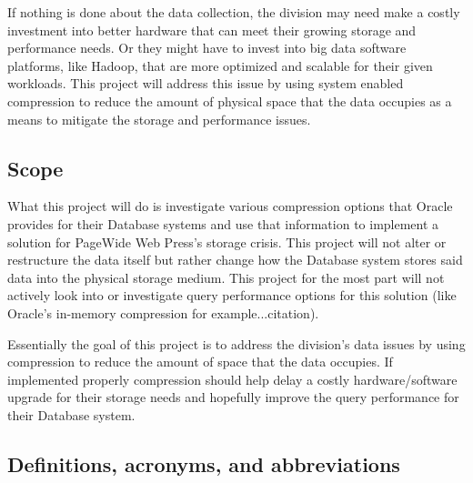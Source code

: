 \documentclass[10pt]{article}
\begin{document}
If nothing is done about the data collection, the division may need make a costly investment into better hardware that can meet their growing storage and performance needs. Or they might have to invest into big data software platforms, like Hadoop, that are more optimized and scalable for their given workloads. This project will address this issue by using system enabled compression to reduce the amount of physical space that the data occupies as a means to mitigate the storage and performance issues.


\subsection{Scope}

What this project will do is investigate various compression options that Oracle provides for their Database systems and use that information to implement a solution for PageWide Web Press's storage crisis. This project will not alter or restructure the data itself but rather change how the Database system stores said data into the physical storage medium. This project for the most part will not actively look into or investigate query performance options for this solution (like Oracle's in-memory compression for example...citation).

Essentially the goal of this project is to address the division's data issues by using compression to reduce the amount of space that the data occupies. If implemented properly compression should help delay a costly hardware/software upgrade for their storage needs and hopefully improve the query performance for their Database system.


\subsection{Definitions, acronyms, and abbreviations}
\end{document}

